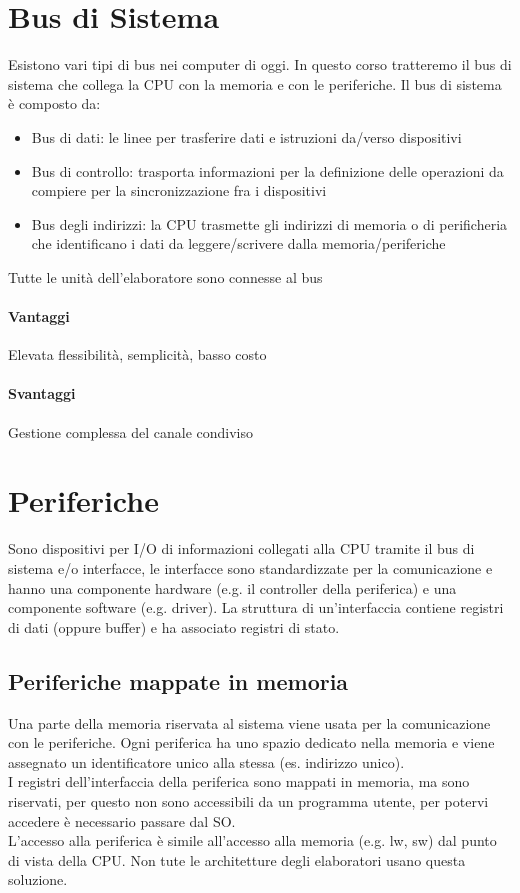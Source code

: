 \documentclass[12pt, a4paper, openany]{book}
\begin{document}
\section{Bus di Sistema}
Esistono vari tipi di bus nei computer di oggi. In questo corso tratteremo il bus di sistema
che collega la CPU con la memoria e con le periferiche.
Il bus di sistema è composto da:
\begin{itemize}
    \item Bus di dati: le linee per trasferire dati e istruzioni da/verso dispositivi
    \item Bus di controllo: trasporta informazioni per la definizione delle operazioni
    da compiere per la sincronizzazione fra i dispositivi
    \item Bus degli indirizzi: la CPU trasmette gli indirizzi di memoria o di perificheria che
    identificano i dati da leggere/scrivere dalla memoria/periferiche
\end{itemize}
Tutte le unità dell'elaboratore sono connesse al bus
\paragraph*{Vantaggi} Elevata flessibilità, semplicità, basso costo
\paragraph*{Svantaggi} Gestione complessa del canale condiviso

\section{Periferiche}
Sono dispositivi per I/O di informazioni collegati alla CPU tramite il bus di sistema e/o interfacce,
le interfacce sono standardizzate per la comunicazione e hanno una componente hardware (e.g. il controller
della periferica) e una componente software (e.g. driver).
La struttura di un'interfaccia contiene registri di dati (oppure buffer) e ha associato registri di stato.

\subsection*{Periferiche mappate in memoria}
Una parte della memoria riservata al sistema viene usata per la comunicazione con le periferiche.
Ogni periferica ha uno spazio dedicato nella memoria e viene assegnato un identificatore unico alla stessa
(es. indirizzo unico).
\\ I registri dell'interfaccia della periferica sono mappati in memoria, ma sono riservati, per questo non sono accessibili da
un programma utente, per potervi accedere è necessario passare dal SO.
\\ L'accesso alla periferica è simile all'accesso alla memoria (e.g. lw, sw) dal punto di vista della CPU.
Non tute le architetture degli elaboratori usano questa soluzione.
\end{document}
